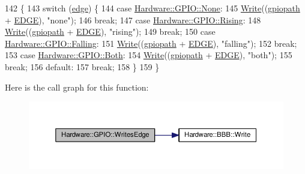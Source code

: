 \begin{DoxyCode}
142                                                        \{
143   \textcolor{keywordflow}{switch} (\hyperlink{class_hardware_1_1_g_p_i_o_adf15f74f053069029e99934e28c109e0}{edge}) \{
144   \textcolor{keywordflow}{case} \hyperlink{class_hardware_1_1_g_p_i_o_a9a7595aabdac9aec75f22e8b86342162aa49ebde2bcdeefb0e7be23fd0fbbdee6}{Hardware::GPIO::None}:
145     \hyperlink{class_hardware_1_1_b_b_b_a155cc06f76d82a6b690ce5ea08e7c68e}{Write}((\hyperlink{class_hardware_1_1_g_p_i_o_ac47062ed6aba52b9e8506e1575bf5061}{gpiopath} + \hyperlink{_g_p_i_o_8h_ac243bfa96aa2c28014159ff098bd2324}{EDGE}), \textcolor{stringliteral}{"none"});
146     \textcolor{keywordflow}{break};
147   \textcolor{keywordflow}{case} \hyperlink{class_hardware_1_1_g_p_i_o_a9a7595aabdac9aec75f22e8b86342162afbb0aadc6c0311beb25d5a056c61ed46}{Hardware::GPIO::Rising}:
148     \hyperlink{class_hardware_1_1_b_b_b_a155cc06f76d82a6b690ce5ea08e7c68e}{Write}((\hyperlink{class_hardware_1_1_g_p_i_o_ac47062ed6aba52b9e8506e1575bf5061}{gpiopath} + \hyperlink{_g_p_i_o_8h_ac243bfa96aa2c28014159ff098bd2324}{EDGE}), \textcolor{stringliteral}{"rising"});
149     \textcolor{keywordflow}{break};
150   \textcolor{keywordflow}{case} \hyperlink{class_hardware_1_1_g_p_i_o_a9a7595aabdac9aec75f22e8b86342162a0db6d4392aec905f4fd0576c2cba9279}{Hardware::GPIO::Falling}:
151     \hyperlink{class_hardware_1_1_b_b_b_a155cc06f76d82a6b690ce5ea08e7c68e}{Write}((\hyperlink{class_hardware_1_1_g_p_i_o_ac47062ed6aba52b9e8506e1575bf5061}{gpiopath} + \hyperlink{_g_p_i_o_8h_ac243bfa96aa2c28014159ff098bd2324}{EDGE}), \textcolor{stringliteral}{"falling"});
152     \textcolor{keywordflow}{break};
153   \textcolor{keywordflow}{case} \hyperlink{class_hardware_1_1_g_p_i_o_a9a7595aabdac9aec75f22e8b86342162aa6f3d9102e894c4bf553a679ad2148c3}{Hardware::GPIO::Both}:
154     \hyperlink{class_hardware_1_1_b_b_b_a155cc06f76d82a6b690ce5ea08e7c68e}{Write}((\hyperlink{class_hardware_1_1_g_p_i_o_ac47062ed6aba52b9e8506e1575bf5061}{gpiopath} + \hyperlink{_g_p_i_o_8h_ac243bfa96aa2c28014159ff098bd2324}{EDGE}), \textcolor{stringliteral}{"both"});
155     \textcolor{keywordflow}{break};
156   \textcolor{keywordflow}{default}:
157     \textcolor{keywordflow}{break};
158   \}
159 \}
\end{DoxyCode}


Here is the call graph for this function\+:\nopagebreak
\begin{figure}[H]
\begin{center}
\leavevmode
\includegraphics[width=350pt]{class_hardware_1_1_g_p_i_o_a99e41223fcd93f47f3acf4851fc32de2_cgraph}
\end{center}
\end{figure}




